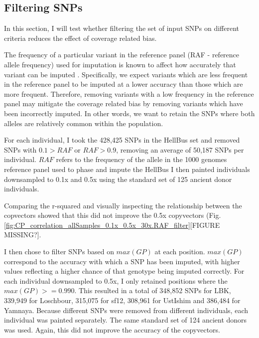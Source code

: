 \subsection{Filtering SNPs}

In this section, I will test whether filtering the set of input SNPs on different criteria reduces the effect of coverage related bias. 

The frequency of a particular variant in the reference panel (RAF - reference allele frequency) used for imputation is known to affect how accurately that variant can be imputed \cite{rubinacci2021efficient, delaneau2018integrative, Browning2016, hui2020evaluating}. Specifically, we expect variants which are less frequent in the reference panel to be imputed at a lower accuracy than those which are more frequent. Therefore, removing variants with a low frequency in the reference panel may mitigate the coverage related bias by removing variants which have been incorrectly imputed. In other words, we want to retain the SNPs where both alleles are relatively common within the population. 

For each individual, I took the 428,425 SNPs in the HellBus set and removed SNPs with $0.1 > RAF$ or $RAF > 0.9$, removing an average of 50,187 SNPs per individual. $RAF$ refers to the frequency of the allele in the 1000 genomes reference panel used to phase and impute the HellBus I then painted individuals downsampled to 0.1x and 0.5x using the standard set of 125 ancient donor individuals.  

Comparing the r-squared and visually inspecting the relationship between the copvectors showed that this did not improve the 0.5x copyvectors (Fig. \ref{fig:CP_correlation_allSamples_0.1x_0.5x_30x.RAF_filter}{\color{red}[FIGURE MISSING?]}.

I then chose to filter SNPs based on $max(GP)$ at each position. $max(GP)$ correspond to the accuracy with which a SNP has been imputed, with higher values reflecting a higher chance of that genotype being imputed correctly. For each individual downsampled to 0.5x, I only retained positions where the $max(GP) >= 0.990$. This resulted in a total of 348,852 SNPs for LBK, 339,949 for Loschbour, 315,075 for sf12, 308,961 for UstIshim and 386,484 for Yamnaya. Because different SNPs were removed from different individuals, each individual was painted separately. The same standard set of 124 ancient donors was used. Again, this did not improve the accuracy of the copyvectors. 

